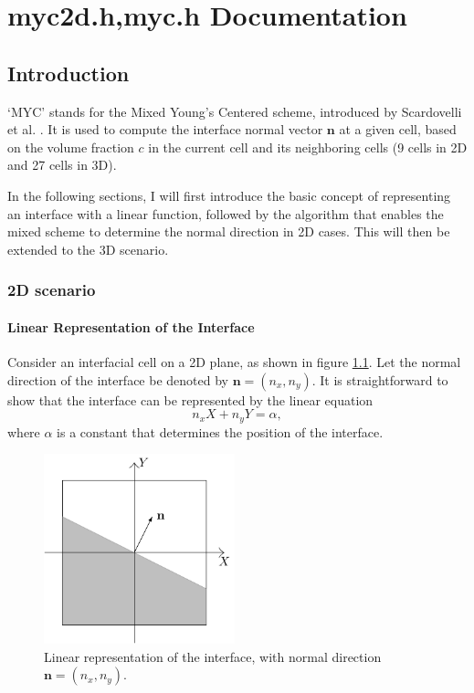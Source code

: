 \chapter{myc2d.h,myc.h Documentation}
\ifsingle
\maketitle
\fi
\chaptermeta[draft][2025-07-15]

\section{Introduction}
‘MYC’ stands for the Mixed Young’s Centered scheme, introduced by Scardovelli et al. \cite{2003_Scardovelli}. It is used to compute the interface normal vector $\mathbf{n}$ at a given cell, based on the volume fraction $c$ in the current cell and its neighboring cells (9 cells in 2D and 27 cells in 3D).

In the following sections, I will first introduce the basic concept of representing an interface with a linear function, followed by the algorithm that enables the mixed scheme to determine the normal direction in 2D cases. This will then be extended to the 3D scenario.

\subsection{2D scenario}
\subsubsection{Linear Representation of the Interface}

Consider an interfacial cell on a 2D plane, as shown in figure \ref{fig:myc-2Dlinear}. Let the normal direction of the interface be denoted by $\mathbf{n} = (n_x, n_y)$. It is straightforward to show that the interface can be represented by the linear equation
\begin{equation}\label{equ:myc-original}
  n_x X + n_y Y = \alpha,
\end{equation}
where $\alpha$ is a constant that determines the position of the interface.

\begin{figure}[H]
    \centering
    \includegraphics[height=5.5cm]{./image/myc-h-and-myc2d-h/2Dlinear-face.pdf}
    \caption{Linear representation of the interface, with normal direction $\mathbf{n} = (n_x, n_y)$.}
    \label{fig:myc-2Dlinear}
\end{figure}


